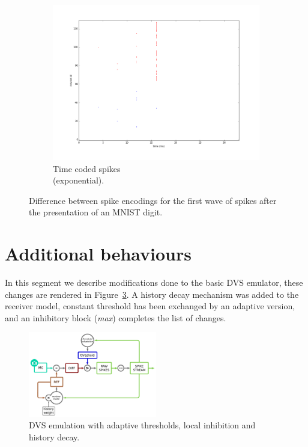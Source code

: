 \documentclass[twocolumn, a4paper]{article}
\begin{document}
\begin{figure}[htb]
  \begin{subfigure}[b]{0.25\textwidth}
    \includegraphics[width=\textwidth]{time_exp_coded_-8x8-_cycle_0}
    \caption{Time coded spikes \\(exponential).}
    \label{fig:time_exp_spikes}
  \end{subfigure}
  
  \caption{Difference between spike encodings for the first wave of spikes after the presentation of an MNIST digit.}
  \label{fig:spike_codes}
\end{figure}

\section{Additional behaviours}
\label{sec:additional-behaviours}
In this segment we describe modifications done to the basic DVS emulator, these changes are rendered in Figure~\ref{fig:dvs_emu_inh}. A history decay mechanism was added to the receiver model, constant threshold has been exchanged by an adaptive version, and an inhibitory block (\textit{\textsf{max}}) completes the list of changes.

\begin{figure}[htb]
  
  \includegraphics[width=0.5\textwidth]{dvs_emu_decay_adapt_inh}
  \caption{DVS emulation with adaptive thresholds, local inhibition and history decay.}
  \label{fig:dvs_emu_inh}
\end{figure}
\end{document}
